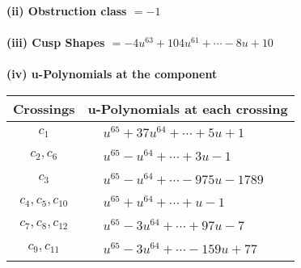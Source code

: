 \documentclass[1p]{elsarticle_modified}
\theoremstyle{definition}
\begin{document}
\flushleft \textbf{(ii) Obstruction class $= -1$}\\~\\
\flushleft \textbf{(iii) Cusp Shapes $= -4 u^{63}+104 u^{61}+\cdots-8 u+10$}\\~\\
\newpage\renewcommand{\arraystretch}{1}
\flushleft \textbf{(iv) u-Polynomials at the component}\newline \\
\begin{tabular}{m{50pt}|m{274pt}}
Crossings & \hspace{64pt}u-Polynomials at each crossing \\
\hline $$\begin{aligned}c_{1}\end{aligned}$$&$\begin{aligned}
&u^{65}+37 u^{64}+\cdots+5 u+1
\end{aligned}$\\
\hline $$\begin{aligned}c_{2},c_{6}\end{aligned}$$&$\begin{aligned}
&u^{65}- u^{64}+\cdots+3 u-1
\end{aligned}$\\
\hline $$\begin{aligned}c_{3}\end{aligned}$$&$\begin{aligned}
&u^{65}- u^{64}+\cdots-975 u-1789
\end{aligned}$\\
\hline $$\begin{aligned}c_{4},c_{5},c_{10}\end{aligned}$$&$\begin{aligned}
&u^{65}+u^{64}+\cdots+u-1
\end{aligned}$\\
\hline $$\begin{aligned}c_{7},c_{8},c_{12}\end{aligned}$$&$\begin{aligned}
&u^{65}-3 u^{64}+\cdots+97 u-7
\end{aligned}$\\
\hline $$\begin{aligned}c_{9},c_{11}\end{aligned}$$&$\begin{aligned}
&u^{65}-3 u^{64}+\cdots-159 u+77
\end{aligned}$\\
\hline
\end{tabular}\\~\\
\end{document}
